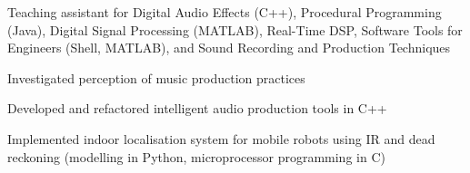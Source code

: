 \documentclass[letterpaper]{deedy-resume} %
\begin{document}
{\begin{minipage}[t]{0.66\textwidth}
\hspace{-0.1cm}
\begin{tightitemize}
\item Teaching assistant for Digital Audio Effects (C++), Procedural Programming (Java), Digital Signal Processing (MATLAB), Real-Time DSP, Software Tools for Engineers (Shell, MATLAB), and Sound Recording and Production Techniques
\end{tightitemize}


\hspace{-0.1cm}
\begin{tightitemize}
\item Investigated perception of music production practices
\item Developed and refactored intelligent audio production tools in C++
\end{tightitemize}


\hspace{-0.1cm} 
\begin{tightitemize}
\item Implemented indoor localisation system for mobile robots using IR and dead reckoning (modelling in Python, microprocessor programming in C)
\end{tightitemize}




\end{minipage}}
\end{document}

